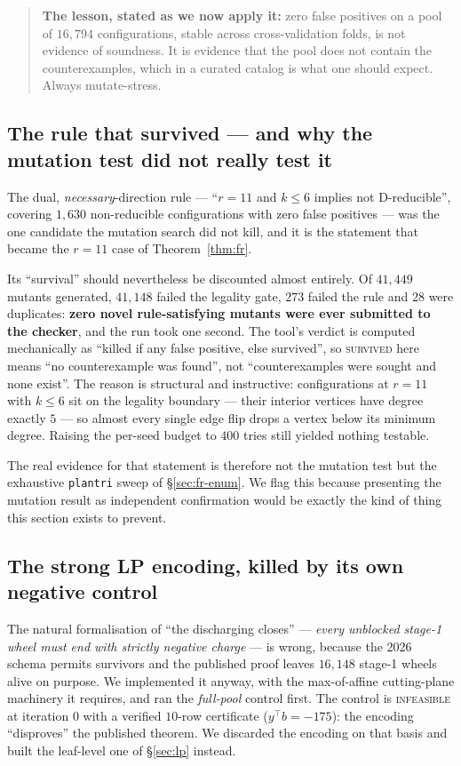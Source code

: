 \documentclass[11pt]{article}
\theoremstyle{definition}
\begin{document}
\begin{quote}
\textbf{The lesson, stated as we now apply it:} zero false positives on a pool of
$16{,}794$ configurations, stable across cross-validation folds, is not evidence of
soundness. It is evidence that the pool does not contain the counterexamples, which
in a curated catalog is what one should expect. Always mutate-stress.
\end{quote}

\subsection{The rule that survived --- and why the mutation test did not really test it}

The dual, \emph{necessary}-direction rule --- ``$r=11$ and $k \le 6$ implies
not D-reducible'', covering $1{,}630$ non-reducible configurations with zero false
positives --- was the one candidate the mutation search did not kill, and it is the
statement that became the $r=11$ case of Theorem~\ref{thm:fr}.

Its ``survival'' should nevertheless be discounted almost entirely. Of $41{,}449$
mutants generated, $41{,}148$ failed the legality gate, $273$ failed the rule and
$28$ were duplicates: \textbf{zero novel rule-satisfying mutants were ever submitted
to the checker}, and the run took one second. The tool's verdict is computed
mechanically as ``killed if any false positive, else survived'', so
\textsc{survived} here means ``no counterexample was found'', not ``counterexamples
were sought and none exist''. The reason is structural and instructive: configurations
at $r=11$ with $k \le 6$ sit on the legality boundary --- their interior vertices have
degree exactly $5$ --- so almost every single edge flip drops a vertex below its
minimum degree. Raising the per-seed budget to $400$ tries still yielded nothing
testable.

The real evidence for that statement is therefore not the mutation test but the
exhaustive \texttt{plantri} sweep of \S\ref{sec:fr-enum}. We flag this because
presenting the mutation result as independent confirmation would be exactly the kind
of thing this section exists to prevent.

\subsection{The strong LP encoding, killed by its own negative control}

The natural formalisation of ``the discharging closes'' --- \emph{every unblocked
stage-1 wheel must end with strictly negative charge} --- is wrong, because the 2026
schema permits survivors and the published proof leaves $16{,}148$ stage-1 wheels
alive on purpose. We implemented it anyway, with the max-of-affine cutting-plane
machinery it requires, and ran the \emph{full-pool} control first. The control is
\textsc{infeasible} at iteration $0$ with a verified $10$-row certificate
($y^\top b = -175$): the encoding ``disproves'' the published theorem. We discarded
the encoding on that basis and built the leaf-level one of \S\ref{sec:lp}
instead.
\end{document}
